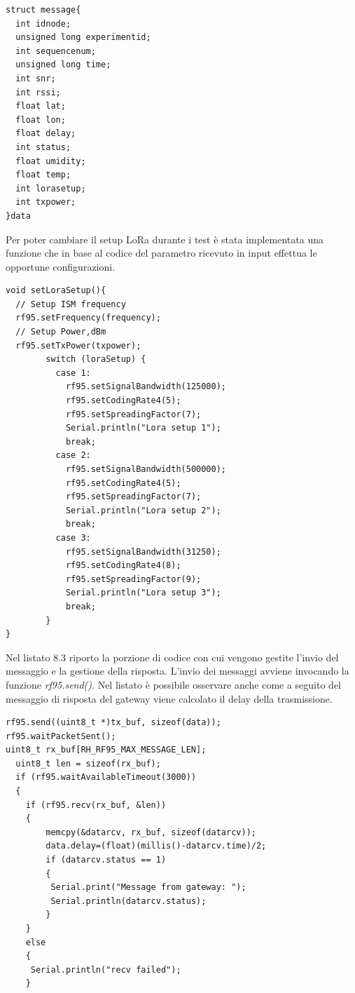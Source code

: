 \documentclass[12pt,a4paper,openright,twoside]{report}
\begin{document}
\begin{lstlisting}
struct message{
  int idnode;
  unsigned long experimentid;
  int sequencenum;
  unsigned long time;
  int snr;
  int rssi;
  float lat;
  float lon;
  float delay;
  int status;
  float umidity;
  float temp;
  int lorasetup;
  int txpower;
}data
\end{lstlisting}
Per poter cambiare il setup LoRa durante i test \`e stata implementata una funzione che in base al codice del parametro ricevuto in input effettua le opportune configurazioni.


\begin{lstlisting}
void setLoraSetup(){
  // Setup ISM frequency
  rf95.setFrequency(frequency);
  // Setup Power,dBm
  rf95.setTxPower(txpower);
        switch (loraSetup) {
          case 1:
            rf95.setSignalBandwidth(125000);
            rf95.setCodingRate4(5);
            rf95.setSpreadingFactor(7);
            Serial.println("Lora setup 1");
            break;
          case 2:
            rf95.setSignalBandwidth(500000);
            rf95.setCodingRate4(5);
            rf95.setSpreadingFactor(7);
            Serial.println("Lora setup 2");
            break;
          case 3:
            rf95.setSignalBandwidth(31250);
            rf95.setCodingRate4(8);
            rf95.setSpreadingFactor(9);
            Serial.println("Lora setup 3");
            break;
        }
}
\end{lstlisting}

Nel listato 8.3 riporto la porzione di codice con cui vengono gestite l'invio del messaggio e la gestione della risposta. L'invio dei messaggi avviene invocando la funzione \textit{rf95.send()}. Nel listato \`e possibile osservare anche come a seguito del messaggio di risposta del gateway viene calcolato il delay della trasmissione.

\begin{lstlisting}
rf95.send((uint8_t *)tx_buf, sizeof(data));
rf95.waitPacketSent();
uint8_t rx_buf[RH_RF95_MAX_MESSAGE_LEN];
  uint8_t len = sizeof(rx_buf);
  if (rf95.waitAvailableTimeout(3000))
  {
    if (rf95.recv(rx_buf, &len))
    {
        memcpy(&datarcv, rx_buf, sizeof(datarcv)); 
        data.delay=(float)(millis()-datarcv.time)/2;
        if (datarcv.status == 1)
        {
         Serial.print("Message from gateway: "); 
         Serial.println(datarcv.status);          
        }      
    }
    else
    {
     Serial.println("recv failed");
    }
\end{lstlisting}
\end{document}
